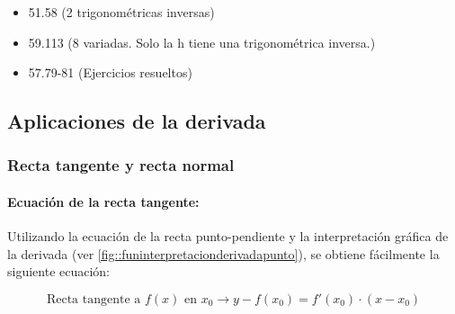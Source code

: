 
\begin{problem}

\begin{itemize}
	\item 51.58 (2 trigonométricas inversas)
	\item 59.113 (8 variadas. Solo la h tiene una trigonométrica inversa.)
	\item 57.79-81 (Ejercicios resueltos)
\end{itemize}

\solution
\end{problem}


\subsection{Aplicaciones de la derivada}

\subsubsection{Recta tangente y recta normal}

\paragraph{Ecuación de la recta tangente:} Utilizando la ecuación de la recta punto-pendiente y la interpretación gráfica de la derivada (ver \ref{fig::funinterpretacionderivadapunto}), se obtiene fácilmente la siguiente ecuación:

\begin{mdframed}
	\begin{equation}
		\label{eq::rectatangente}
		\text{Recta tangente a }f(x)\text{ en }x_0 \to y-f(x_0) = f'(x_0)·(x-x_0)
	\end{equation}
\end{mdframed}

